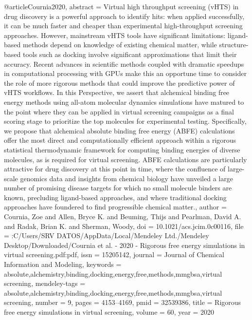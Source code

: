 @article{Cournia2020,
abstract = {Virtual high throughput screening (vHTS) in drug discovery is a powerful approach to identify hits: when applied successfully, it can be much faster and cheaper than experimental high-throughput screening approaches. However, mainstream vHTS tools have significant limitations: ligand-based methods depend on knowledge of existing chemical matter, while structure-based tools such as docking involve significant approximations that limit their accuracy. Recent advances in scientific methods coupled with dramatic speedups in computational processing with GPUs make this an opportune time to consider the role of more rigorous methods that could improve the predictive power of vHTS workflows. In this Perspective, we assert that alchemical binding free energy methods using all-atom molecular dynamics simulations have matured to the point where they can be applied in virtual screening campaigns as a final scoring stage to prioritize the top molecules for experimental testing. Specifically, we propose that alchemical absolute binding free energy (ABFE) calculations offer the most direct and computationally efficient approach within a rigorous statistical thermodynamic framework for computing binding energies of diverse molecules, as is required for virtual screening. ABFE calculations are particularly attractive for drug discovery at this point in time, where the confluence of large-scale genomics data and insights from chemical biology have unveiled a large number of promising disease targets for which no small molecule binders are known, precluding ligand-based approaches, and where traditional docking approaches have foundered to find progressible chemical matter.},
author = {Cournia, Zoe and Allen, Bryce K. and Beuming, Thijs and Pearlman, David A. and Radak, Brian K. and Sherman, Woody},
doi = {10.1021/acs.jcim.0c00116},
file = {:C\:/Users/SRV DATOS/AppData/Local/Mendeley Ltd./Mendeley Desktop/Downloaded/Cournia et al. - 2020 - Rigorous free energy simulations in virtual screening.pdf:pdf},
issn = {15205142},
journal = {Journal of Chemical Information and Modeling},
keywords = {absolute,alchemistry,binding,docking,energy,free,methods,mmgbsa,virtual screening},
mendeley-tags = {absolute,alchemistry,binding,docking,energy,free,methods,mmgbsa,virtual screening},
number = {9},
pages = {4153--4169},
pmid = {32539386},
title = {{Rigorous free energy simulations in virtual screening}},
volume = {60},
year = {2020}
}
